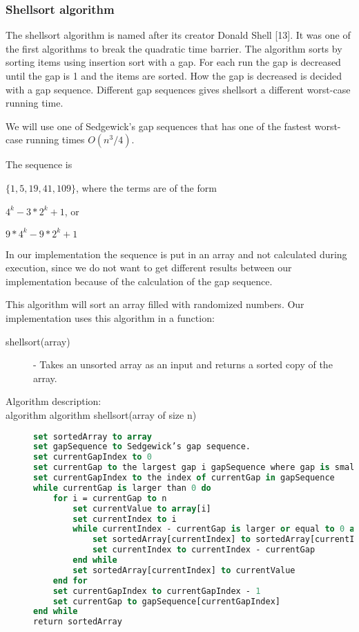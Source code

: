 \documentclass {article}
\begin{document}
\subsubsection{Shellsort algorithm}
The shellsort algorithm is named after its creator Donald Shell [13]. It was one of the first algorithms to break the quadratic time barrier. The algorithm sorts by sorting items using insertion sort with a gap. For each run the gap is decreased until the gap is 1 and the items are sorted. How the gap is decreased is decided with a gap sequence. Different gap sequences gives shellsort a different worst-case running time.
 
We will use one of Sedgewick’s gap sequences that has one of the fastest worst-case running times \(O(n^3/4)\). 

The sequence is 

\(\{1, 5, 19, 41, 109\}\), where the terms are of the form

\(4^k - 3 * 2^k + 1\), or

\(9 * 4^k - 9 * 2^k + 1\)
 
In our implementation the sequence is put in an array and not calculated during execution, since we do not want to get different results between our implementation because of the calculation of the gap sequence.

This algorithm will sort an array filled with randomized numbers. Our implementation uses this algorithm in a function:

\begin{description}
\item[shellsort(array)] - Takes an unsorted array as an input and returns a sorted copy of the array.

\item[Algorithm description:]
\item[algorithm algorithm shellsort(array of size n)]
\item []
\begin{lstlisting}[language=Pascal]
set sortedArray to array
set gapSequence to Sedgewick’s gap sequence.
set currentGapIndex to 0
set currentGap to the largest gap i gapSequence where gap is smaller than n divided by 2
set currentGapIndex to the index of currentGap in gapSequence
while currentGap is larger than 0 do
 	for i = currentGap to n
 		set currentValue to array[i]
 		set currentIndex to i
 		while currentIndex - currentGap is larger or equal to 0 and sortedArray[currentIndex - currentGap] is larger than currentValue do
 			set sortedArray[currentIndex] to sortedArray[currentIndex - currentGap]
 			set currentIndex to currentIndex - currentGap
 		end while
 		set sortedArray[currentIndex] to currentValue
 	end for
 	set currentGapIndex to currentGapIndex - 1
 	set currentGap to gapSequence[currentGapIndex]
end while
return sortedArray
\end{lstlisting}
\end{description}
\end{document}
